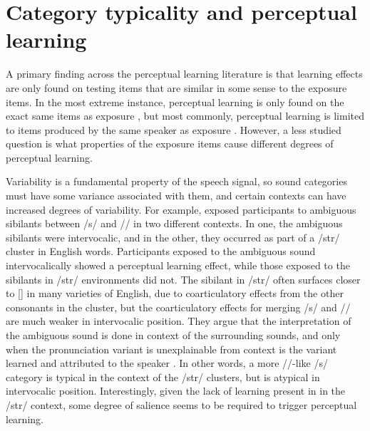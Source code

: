 \section{Category typicality and perceptual learning}
\label{sec:signal}

A primary finding across the perceptual learning literature is that learning effects are only found on testing items that are similar in some sense to the exposure items.  In the most extreme instance, perceptual learning is only found on the exact same items as exposure \citep{Reinisch2014}, but most commonly, perceptual learning is limited to items produced by the same speaker as exposure \citep{Norris2003,Reinisch2013}.  However, a less studied question is what properties of the exposure items cause different degrees of perceptual learning.  

Variability is a fundamental property of the speech signal, so sound categories must have some variance associated with them, and certain contexts can have increased degrees of variability.
For example, \citet{Kraljic2008a} exposed participants to ambiguous sibilants between /s/ and /\textesh/ in two different contexts.  
In one, the ambiguous sibilants were intervocalic, and in the other, they occurred as part of a /str/ cluster in English words.  
Participants exposed to the ambiguous sound intervocalically showed a perceptual learning effect, while those exposed to the sibilants in /str/ environments did not.  
The sibilant in /str/ often surfaces closer to [\textesh] in many varieties of English, due to coarticulatory effects from the other consonants in the cluster, but the coarticulatory effects for merging /s/ and /\textesh/ are much weaker in intervocalic position.  
They argue that the interpretation of the ambiguous sound is done in context of the surrounding sounds, and only when the pronunciation variant is unexplainable from context is the variant learned and attributed to the speaker \citep[see also][]{Kraljic2008}.
In other words, a more /\textesh/-like /s/ category is typical in the context of the /str/ clusters, but is atypical in intervocalic position.
Interestingly, given the lack of learning present in in the /str/ context, some degree of salience seems to be required to trigger perceptual learning.

